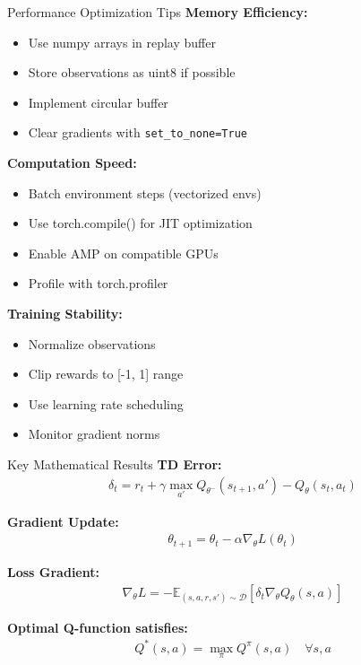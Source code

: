 \documentclass[aspectratio=169,10pt]{beamer}
\begin{document}
\begin{frame}{Performance Optimization Tips}
\textbf{Memory Efficiency:}
\begin{itemize}
    \item Use numpy arrays in replay buffer
    \item Store observations as uint8 if possible
    \item Implement circular buffer
    \item Clear gradients with \texttt{set\_to\_none=True}
\end{itemize}

\textbf{Computation Speed:}
\begin{itemize}
    \item Batch environment steps (vectorized envs)
    \item Use torch.compile() for JIT optimization
    \item Enable AMP on compatible GPUs
    \item Profile with torch.profiler
\end{itemize}

\textbf{Training Stability:}
\begin{itemize}
    \item Normalize observations
    \item Clip rewards to [-1, 1] range
    \item Use learning rate scheduling
    \item Monitor gradient norms
\end{itemize}
\end{frame}

\begin{frame}{Key Mathematical Results}
\textbf{TD Error:}
\begin{align}
\delta_t = r_t + \gamma \max_{a'} Q_{\theta^-}(s_{t+1}, a') - Q_\theta(s_t, a_t)
\end{align}

\textbf{Gradient Update:}
\begin{align}
\theta_{t+1} = \theta_t - \alpha \nabla_\theta L(\theta_t)
\end{align}

\textbf{Loss Gradient:}
\begin{align}
\nabla_\theta L = -\mathbb{E}_{(s,a,r,s') \sim \mathcal{D}} \left[ \delta_t \nabla_\theta Q_\theta(s,a) \right]
\end{align}

\textbf{Optimal Q-function satisfies:}
\begin{align}
Q^*(s,a) = \max_\pi Q^\pi(s,a) \quad \forall s,a
\end{align}
\end{frame}
\end{document}
